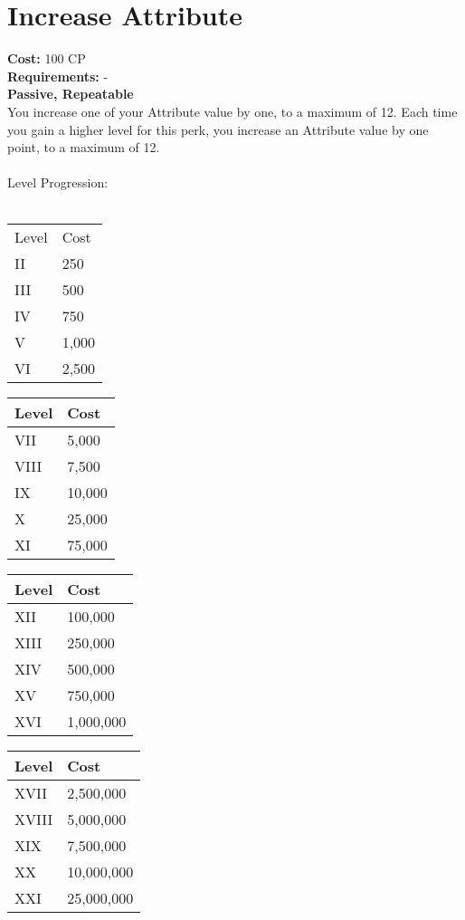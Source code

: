 \section{Increase Attribute}\label{sec:increaseattribute}
\textbf{Cost:} 100 CP\\
\textbf{Requirements:} -\\
\textbf{Passive, Repeatable}\\
You increase one of your Attribute value by one, to a maximum of 12.
Each time you gain a higher level for this perk, you increase an Attribute value by one point, to a maximum of 12.\\
\\
Level Progression:\\
\\
\begin{minipage}{0.22\textwidth}
	\begin{tabular}{l | l}
		Level & Cost\\
		II & 250\\
		III & 500\\
		IV & 750\\
		V & 1,000\\
		VI & 2,500\\
	\end{tabular}
\end{minipage}
\begin{minipage}{0.22\textwidth}
	\begin{tabular}{l | l}
		Level & Cost\\ \hline
		VII & 5,000\\
		VIII & 7,500\\
		IX & 10,000\\
		X & 25,000\\
		XI & 75,000\\
	\end{tabular}
\end{minipage}
\begin{minipage}{0.22\textwidth}
	\begin{tabular}{l | l}
		Level & Cost\\ \hline
		XII & 100,000\\
		XIII & 250,000\\
		XIV & 500,000\\
		XV & 750,000\\
		XVI & 1,000,000\\
	\end{tabular}
\end{minipage}
\begin{minipage}{0.22\textwidth}
	\begin{tabular}{l | l}
		Level & Cost\\ \hline
		XVII & 2,500,000\\
		XVIII & 5,000,000\\
		XIX & 7,500,000\\
		XX & 10,000,000\\
		XXI & 25,000,000\\
	\end{tabular}
\end{minipage}